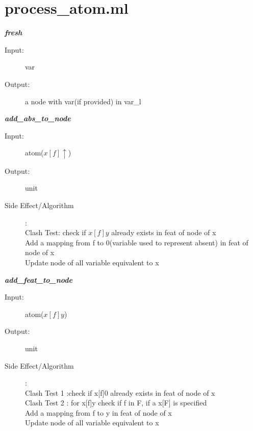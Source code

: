 \documentclass[12pt]{article}
\begin{document}
\section{process\_atom.ml}
\begin{description}

\item \textbf{\textit{fresh}}
\begin{description}
    \item[Input:] var
    \item[Output:] a node with var(if provided) in var\_l
\end{description}


\item \textbf{\textit{add\_abs\_to\_node}}
\begin{description}
    \item[Input:] atom($x[f]\uparrow$)
    \item[Output:] unit
    \item[Side Effect/Algorithm]:\\Clash Test: check if $x[f]y$ already exists in feat of node of x\\
    Add a mapping from f to 0(variable used to represent absent) in feat of node of x\\
    Update node of all variable equivalent to x\\
\end{description}

\item \textbf{\textit{add\_feat\_to\_node}}
\begin{description}
    \item[Input:] atom($x[f]y$)
    \item[Output:] unit
    \item[Side Effect/Algorithm]:\\Clash Test 1 :check if x[f]0 already exists in feat of node of x\\
    Clash Test 2 : for x[f]y check if f in F, if a x[F] is specified\\
    Add a mapping from f to y in feat of node of x\\
    Update node of all variable equivalent to x\\
\end{description}



\end{description}
\end{document}
